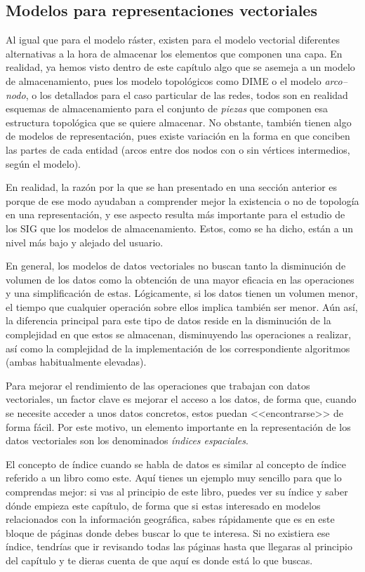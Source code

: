 \begin{multicols}{2}
\subsection{Modelos para representaciones vectoriales}

Al igual que para el modelo ráster, existen para el modelo vectorial diferentes alternativas a la hora de almacenar los elementos que componen una capa. En realidad, ya hemos visto dentro de este capítulo algo que se asemeja a un modelo de almacenamiento, pues los modelo topológicos como DIME o el modelo \emph{arco--nodo}, o los detallados para el caso particular de las redes, todos son en realidad esquemas de almacenamiento para el conjunto de \emph{piezas} que componen esa estructura topológica que se quiere almacenar. No obstante, también tienen algo de modelos de representación, pues existe variación en la forma en que conciben las partes de cada entidad (arcos entre dos nodos con o sin vértices intermedios, según el modelo). 

En realidad, la razón por la que se han presentado en una sección anterior es porque de ese modo ayudaban a comprender mejor la existencia o no de topología en una representación, y ese aspecto resulta más importante para el estudio de los SIG que los modelos de almacenamiento. Estos, como se ha dicho, están a un nivel más bajo y alejado del usuario.

En general, los modelos de datos vectoriales no buscan tanto la disminución de volumen de los datos como la obtención de una mayor eficacia en las operaciones y una simplificación de estas. Lógicamente, si los datos tienen un volumen menor, el tiempo que cualquier operación sobre ellos implica también ser menor. Aún así, la diferencia principal para este tipo de datos reside en la disminución de la complejidad en que estos se almacenan, disminuyendo las operaciones a realizar, así como la  complejidad de la implementación de los correspondiente algoritmos (ambas habitualmente elevadas).

Para mejorar el rendimiento de las operaciones que trabajan con datos vectoriales, un factor clave es mejorar el acceso a los datos, de forma que, cuando se necesite acceder a unos datos concretos, estos puedan <<encontrarse>> de forma fácil. Por este motivo, un elemento importante en la representación de los datos vectoriales son los denominados \emph{índices espaciales}.

El concepto de índice cuando se habla de datos es similar al concepto de índice referido a un libro como este. Aquí tienes un ejemplo muy sencillo para que lo comprendas mejor: si vas al principio de este libro, puedes ver su índice y saber dónde empieza este capítulo, de forma que si estas interesado en modelos relacionados con la información geográfica, sabes rápidamente que es en este bloque de páginas donde debes buscar lo que te interesa. Si no existiera ese índice, tendrías que ir revisando todas las páginas hasta que llegaras al principio del capítulo y te dieras cuenta de que aquí es donde está lo que buscas. 


\end{multicols}
